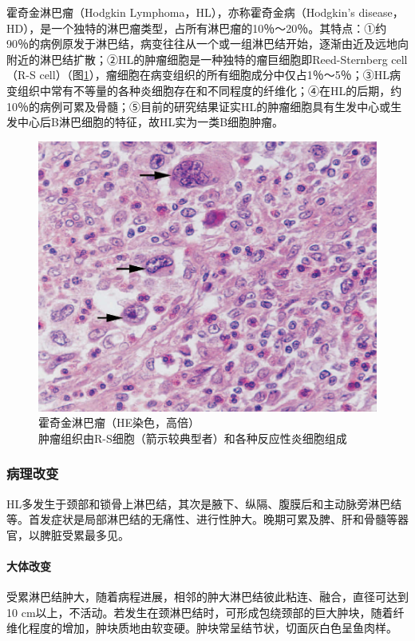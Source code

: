霍奇金淋巴瘤（Hodgkin Lymphoma，HL），亦称霍奇金病（Hodgkin's
disease，HD），是一个独特的淋巴瘤类型，占所有淋巴瘤的10％～20％。其特点：①约90％的病例原发于淋巴结，病变往往从一个或一组淋巴结开始，逐渐由近及远地向附近的淋巴结扩散；②HL的肿瘤细胞是一种独特的瘤巨细胞即Reed-Sternberg
cell（R-S
cell）（图\ref{fig9-3}），瘤细胞在病变组织的所有细胞成分中仅占1％～5％；③HL病变组织中常有不等量的各种炎细胞存在和不同程度的纤维化；④在HL的后期，约10％的病例可累及骨髓；⑤目前的研究结果证实HL的肿瘤细胞具有生发中心或生发中心后B淋巴细胞的特征，故HL实为一类B细胞肿瘤。

\begin{figure}[!htbp]
 \centering
 \includegraphics{./images/Image00144.jpg}
 \captionsetup{justification=centering}
 \caption{霍奇金淋巴瘤（HE染色，高倍）\\ {\small 肿瘤组织由R-S细胞（箭示较典型者）和各种反应性炎细胞组成}}
\label{fig9-3}
  \end{figure}

\subsubsection{病理改变}

HL多发生于颈部和锁骨上淋巴结，其次是腋下、纵隔、腹膜后和主动脉旁淋巴结等。首发症状是局部淋巴结的无痛性、进行性肿大。晚期可累及脾、肝和骨髓等器官，以脾脏受累最多见。

\paragraph{大体改变}
受累淋巴结肿大，随着病程进展，相邻的肿大淋巴结彼此粘连、融合，直径可达到10
cm以上，不活动。若发生在颈淋巴结时，可形成包绕颈部的巨大肿块，随着纤维化程度的增加，肿块质地由软变硬。肿块常呈结节状，切面灰白色呈鱼肉样。

